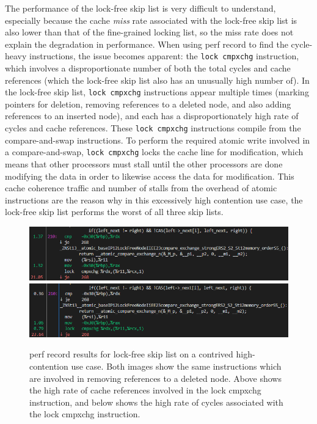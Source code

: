 \documentclass[11pt]{article}
\newcommand{\ttt}[1]{\texttt{#1}}
\begin{document}
The performance of the lock-free skip list is very difficult to understand, especially because the cache \textit{miss} rate associated with the lock-free skip list is also lower than that of the fine-grained locking list, so the miss rate does not explain the degradation in performance. When using perf record to find the cycle-heavy instructions, the issue becomes apparent: the \texttt{lock cmpxchg} instruction, which involves a disproportionate number of both the total cycles and cache references (which the lock-free skip list also has an unusually high number of). In the lock-free skip list, \texttt{lock cmpxchg} instructions appear multiple times (marking pointers for deletion, removing references to a deleted node, and also adding references to an inserted node), and each has a disproportionately high rate of cycles and cache references. These \texttt{lock cmpxchg} instructions compile from the compare-and-swap instructions. To perform the required atomic write involved in a compare-and-swap, \ttt{lock cmpxchg} locks the cache line for modification, which means that other processors must stall until the other processors are done modifying the data in order to likewise access the data for modification. This cache coherence traffic and number of stalls from the overhead of atomic instructions are the reason why in this excessively high contention use case, the lock-free skip list performs the worst of all three skip lists. 

\begin{figure}[h!]
  \includegraphics[width=5in]{ex2_s2_cache_references.png} \\
  \includegraphics[width=5in]{ex2_s2_cycles.png}
  \caption{perf record results for lock-free skip list on a contrived high-contention use case. Both images show the same instructions which are involved in removing references to a deleted node. Above shows the high rate of cache references involved in the lock cmpxchg instruction, and below shows the high rate of cycles associated with the lock cmpxchg instruction.}
\end{figure}
\end{document}
